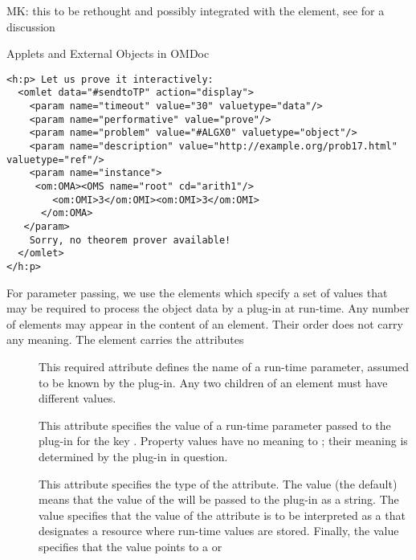 \begin{module}[id=ext]
\begin{omgroup}[id=ext,short=Auxiliary Elements]
\begin{oldpart}{MK: this to be rethought and possibly integrated with the
    {} element, see  for a discussion}
\begin{omgroup}[id=applets]{Applets and External Objects in OMDoc}
\begin{lstlisting}[label=lst:omlet2,mathescape,
  caption={An {\element{omlet}} for Connecting to a Theorem Prover},
  index={omlet}]
<h:p> Let us prove it interactively:
  <omlet data="#sendtoTP" action="display">
    <param name="timeout" value="30" valuetype="data"/>
    <param name="performative" value="prove"/>
    <param name="problem" value="#ALGX0" valuetype="object"/>
    <param name="description" value="http://example.org/prob17.html" valuetype="ref"/>
    <param name="instance">
     <om:OMA><OMS name="root" cd="arith1"/>
        <om:OMI>3</om:OMI><om:OMI>3</om:OMI>
      </om:OMA>
   </param>   
    Sorry, no theorem prover available!
  </omlet>
</h:p>
\end{lstlisting}

\begin{definition}[id=parameter.def]
  For parameter passing, we use the {} elements which specify a set of values
  that may be required to process the object data by a plug-in at run-time. Any number of
  {} elements may appear in the content of an {}
  element. Their order does not carry any meaning. The {} element carries
  the attributes
\begin{description}
\item[{}] This required attribute defines the name of a
  run-time parameter, assumed to be known by the plug-in. Any two {}
  children of an {} element must have different
  {} values.
\item[{}] This attribute specifies the value of a run-time
  parameter passed to the plug-in for the key {}. Property
  values have no meaning to {\omdoc}; their meaning is determined by the plug-in in
  question.
\item[{}] This attribute specifies the type of the
  {} attribute. The value
  {} (the default) means that the value of the
  {} will be passed to the plug-in as a string.  The value
  {} specifies that the value of the
  {} attribute is to be interpreted as a
  {} that designates a resource where run-time values are
  stored. Finally, the value {} specifies that
  the {} value points to a {} or

\end{description}
\end{definition}
\end{omgroup}
\end{oldpart}
\end{omgroup}
\end{module}
